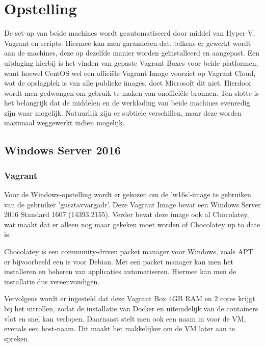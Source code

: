 
\chapter{Opstelling}
\label{ch:opstelling}

De set-up van beide machines wordt geautomatiseerd door middel van Hyper-V, Vagrant en scripts. Hiermee kan men garanderen dat, telkens er gewerkt wordt aan de machines, deze op dezelfde manier worden geïnstalleerd en aangepast.
Een uitdaging hierbij is het vinden van gepaste Vagrant Boxes voor beide platformen, want hoewel CentOS wel een officiële Vagrant Image voorziet op Vagrant Cloud, wat de opslagplek is van alle publieke images, doet Microsoft dit niet. Hierdoor wordt men gedwongen om gebruik te maken van onofficiële bronnen.
Ten slotte is het belangrijk dat de middelen en de werklading van beide machines evenredig zijn waar mogelijk. Natuurlijk zijn er subtiele verschillen, maar deze worden maximaal weggewerkt indien mogelijk. 

\section{Windows Server 2016}


\subsection{Vagrant}
Voor de Windows-opstelling wordt er gekozen om de 'w16s'-image te gebruiken van de gebruiker 'gusztavvargadr'. Deze Vagrant Image bevat een Windows Server 2016 Standard 1607 (14393.2155). Verder bevat deze image ook al Chocolatey, wat maakt dat er alleen nog maar gekeken moet worden of Chocolatey up to date is.

Chocolatey is een community-driven packet manager voor Windows, zoals APT er bijvoorbeeld een is voor Debian. Met een packet manager kan men het installeren en beheren van applicaties automatiseren. Hiermee kan men de installatie dus vereenvoudigen.

Vervolgens wordt er ingesteld dat deze Vagrant Box 4GB RAM en 2 cores krijgt bij het uitrollen, zodat de installatie van Docker en uiteindelijk van de containers vlot en snel kan verlopen. Daarnaast stelt men ook een naam in voor de VM, evenals een host-naam. Dit maakt het makkelijker om de VM later aan te spreken.


